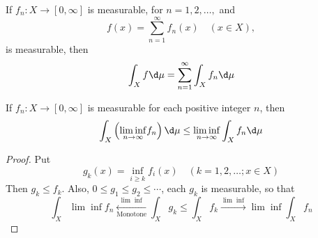 \documentclass[12pt, a4paper, oneside]{book}
\begin{document}
\begin{corollary}
    If $f_n:X\longrightarrow [0,\infty]$ is measurable,  for $n=1,2,\ldots,$ and
    $$f(x)=\sum_{n=1}^{\infty}f_{n}(x)\quad(x\in X),$$
    is measurable, then
    $$\int_{X}f\d \mu=\sum_{n=1}^{\infty}\int_{X}f_{n}\d \mu$$
\end{corollary}

\begin{theorem}
    If $f_n:X\to[0,\infty]$ is measurable for each positive integer $n$, then
    \begin{equation*}
        \int_X \left( \underset{n\to\infty}{\lim\inf}      f_n\right) \d \mu
        \leq
        \underset{n\to\infty}{\lim\inf} \int_X f_n \d \mu
    \end{equation*}
    \begin{proof}
        Put
        $$g_{k}(x)=\inf_{i\geq k}f_i(x)\quad(k=1,2,\ldots;x\in X)$$
        Then $g_k\leq f_k$. Also, $0\leq g_{1}\leq g_{2}\leq\cdots$, each $g_k$ is measurable, so that
        $$\int_X \lim\inf f_n\xleftarrow[\text{Monotone}]{\lim\inf}\int_Xg_k \leq\int_X f_k\xrightarrow{\lim\inf}\lim\inf\int_X f_n$$
    \end{proof}
\end{theorem}
\end{document}
